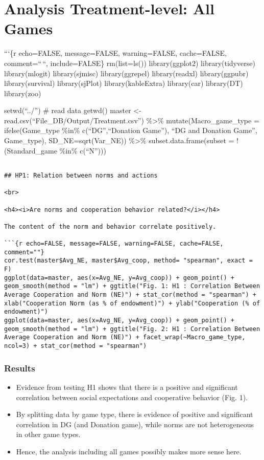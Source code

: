 \hypertarget{analysis-treatment-level-all-games}{%
\section{Analysis Treatment-level: All
Games}\label{analysis-treatment-level-all-games}}

```\{r echo=FALSE, message=FALSE, warning=FALSE, cache=FALSE,
comment=``\,``, include=FALSE\} rm(list=ls()) library(ggplot2)
library(tidyverse) library(mlogit) library(sjmisc) library(ggrepel)
library(readxl) library(ggpubr) library(survival) library(sjPlot)
library(kableExtra) library(car) library(DT) library(zoo)

setwd(``../'') \# read data getwd() master \textless-
read.csv(``File\_DB/Output/Treatment.csv'') \%\textgreater\%
mutate(Macro\_game\_type = ifelse(Game\_type \%in\% c(``DG'',``Donation
Game''), ``DG and Donation Game'', Game\_type), SD\_NE=sqrt(Var\_NE))
\%\textgreater\% subset.data.frame(subset = !(Standard\_game \%in\%
c(``N'')))

\begin{verbatim}

## HP1: Relation between norms and actions

<br>

<h4><i>Are norms and cooperation behavior related?</i></h4>

The content of the norm and behavior correlate positively.

```{r echo=FALSE, message=FALSE, warning=FALSE, cache=FALSE, comment=""}
cor.test(master$Avg_NE, master$Avg_coop, method= "spearman", exact = F)
ggplot(data=master, aes(x=Avg_NE, y=Avg_coop)) + geom_point() + geom_smooth(method = "lm") + ggtitle("Fig. 1: H1 : Correlation Between Average Cooperation and Norm (NE)") + stat_cor(method = "spearman") + xlab("Cooperation Norm (as % of endowment)") + ylab("Cooperation (% of endowment)")
ggplot(data=master, aes(x=Avg_NE, y=Avg_coop)) + geom_point() + geom_smooth(method = "lm") + ggtitle("Fig. 2: H1 : Correlation Between Average Cooperation and Norm (NE)") + facet_wrap(~Macro_game_type, ncol=3) + stat_cor(method = "spearman")
\end{verbatim}

\hypertarget{results}{%
\subsubsection{Results}\label{results}}

\begin{itemize}
\tightlist
\item
  Evidence from testing H1 shows that there is a positive and
  significant correlation between social expectations and cooperative
  behavior (Fig. 1).
\item
  By splitting data by game type, there is evidence of positive and
  significant correlation in DG (and Donation game), while norms are not
  heterogeneous in other game types.
\item
  Hence, the analysis including all games possibly makes more sense
  here.
\end{itemize}

